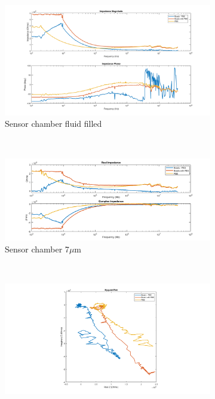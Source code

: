 \begin{figure}[h]
    \centering
    \begin{subfigure}[b]{\textwidth}
        \centering
        \includegraphics[width=\textwidth]{images/IS_data_clean_mag_phase.png}
        \caption{Sensor chamber fluid filled}
    \end{subfigure}
    \\
    \vspace{0.1 in}
    \begin{subfigure}[b]{\textwidth}
        \centering
        \includegraphics[width=\textwidth]{images/IS_data_clean_real_imag.png}
        \caption{Sensor chamber 7$\mu$m }
    \end{subfigure}
    \\
    \vspace{0.1 in}
    \begin{subfigure}[b]{\textwidth}
        \centering
        \includegraphics[width=\textwidth]{images/IS_data_clean_nyquist.png}

\end{subfigure}
\end{figure}
